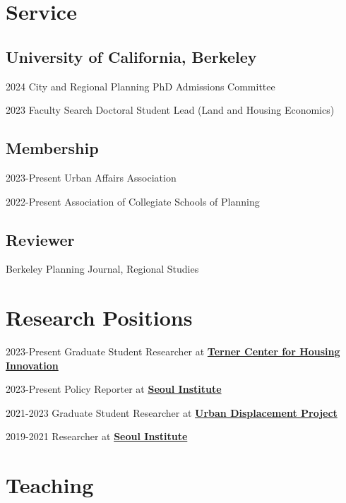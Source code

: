 \documentclass[12pt,letterpaper]{report}
\begin{document}
  \section*{Service}
  \subsection*{University of California, Berkeley}
    \begin{tablist}
        \item[2024] \tab{}City and Regional Planning PhD Admissions Committee
        \item[2023] \tab{}Faculty Search Doctoral Student Lead (Land and Housing Economics)
    \end{tablist}
  \subsection*{Membership}
    \begin{tablist}
        \item[2023-Present] \tab{}Urban Affairs Association
        \item[2022-Present] \tab{}Association of Collegiate Schools of Planning
    \end{tablist}
    \subsection*{Reviewer}
    Berkeley Planning Journal, Regional Studies

    \section*{Research Positions}
    \begin{tablist}
        \item[2023-Present] \tab{}Graduate Student Researcher at \href{https://ternercenter.berkeley.edu/}{\textbf{Terner Center for Housing Innovation}}
        \item[2023-Present] \tab{}Policy Reporter at \href{si.re.kr}{\textbf{Seoul Institute}}
        \item[2021-2023] \tab{}Graduate Student Researcher at \href{https://www.urbandisplacement.org/}{\textbf{Urban Displacement Project}}
        \item[2019-2021] \tab{}Researcher at \href{si.re.kr}{\textbf{Seoul Institute}}
    \end{tablist}

 \section*{Teaching}
\end{document}
